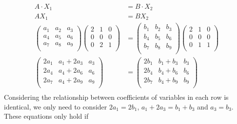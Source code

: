 \documentclass[10pt]{article}
\begin{document}
\begin{enumerate}
\begin{enumerate}
        \begin{align*}
          A \cdot X_1  &= B \cdot X_2 \\
          A X_1 &= B X_2 \\
          \begin{pmatrix}
          a_1 & a_2 & a_3 \\
          a_4 & a_5 & a_6 \\
          a_7 & a_8 & a_9 \\
          \end{pmatrix}
          \begin{pmatrix}
          2 & 1 & 0 \\
          0 & 0 & 0 \\
          0 & 2 & 1 \\
          \end{pmatrix}
            &=
          \begin{pmatrix}
          b_1 & b_2 & b_3 \\
          b_4 & b_5 & b_6 \\
          b_7 & b_8 & b_9 \\
          \end{pmatrix}
          \begin{pmatrix}
          2 & 1 & 0 \\
          0 & 0 & 0 \\
          0 & 1 & 1 \\
          \end{pmatrix} \\
          \begin{pmatrix}
          2a_1 & a_1 + 2a_3 & a_3 \\
          2a_4 & a_4 + 2a_6 & a_6 \\
          2a_7 & a_4 + 2a_9 & a_9 \\
          \end{pmatrix}
            &=
          \begin{pmatrix}
          2b_1 & b_1 + b_3 & b_3 \\
          2b_4 & b_4 + b_6 & b_6 \\
          2b_7 & b_4 + b_9 & b_9 \\
          \end{pmatrix} \\
        \end{align*}
        Considering the relationship between coefficients of variables in each
        row is identical, we only need to consider $2a_1 = 2b_1$,
        $a_1 + 2a_3 = b_1 + b_3$ and $a_3 = b_3$. These equations only hold if

\end{enumerate}
\end{enumerate}
\end{document}
